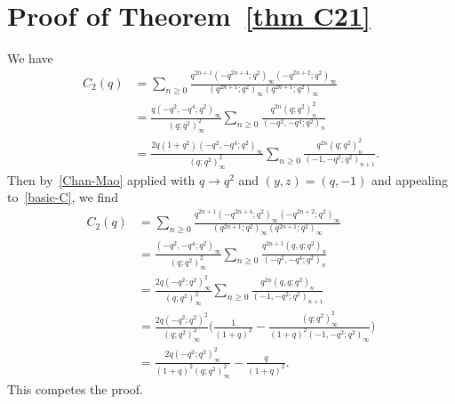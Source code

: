 \documentclass[reqno]{amsart}
\theoremstyle{definition}
\theoremstyle{plain}
\theoremstyle{remark}
\numberwithin{equation}{section}
\newcommand{\fr}{\frac}
\begin{document}
\section{Proof of Theorem~\ref{thm C21}}\label{sec proof C21}
%
We have
\begin{align*}
C_{2}(q)
&= \sum_{n\geq 0}\fr{q^{2n+1} (-q^{2n+4};q^2)_\infty (-q^{2n+2};q^2)_\infty}{(q^{2n+1};q^2)_\infty (q^{2n+1};q^2)_\infty} \\
&=\fr{q (-q^2,-q^4;q^2)_\infty}{(q;q^2)_\infty^2} \sum_{n\geq 0} \fr{q^{2n} (q;q^2)_n^2}{(-q^2,-q^4;q^2)_n} \\
&=\fr{2q(1+q^2)(-q^2,-q^4;q^2)_\infty}{(q;q^2)_\infty^2}\sum_{n\geq 0}\fr{q^{2n} (q;q^2)_n^2}{(-1,-q^2;q^2)_{n+1}}.
\end{align*}
Then by~\eqref{Chan-Mao} applied with $q\to q^2$ and $(y,z)=(q,-1)$ and appealing to~\eqref{basic-C}, we find
\begin{align}
C_{2}(q)
&=\sum_{n\geq 0}\fr{q^{2n+1} (-q^{2n+4};q^2)_\infty (-q^{2n+2};q^2)_\infty}{(q^{2n+1};q^2)_\infty (q^{2n+1};q^2)_\infty} \nonumber \\
&=\fr{(-q^2,-q^4;q^2)_\infty}{(q;q^2)_\infty^2}\sum_{n\geq 0}\fr{q^{2n+1}(q,q;q^2)_n}{(-q^2,-q^4;q^2)_n} \nonumber \\
&=\fr{2q(-q^2;q^2)_\infty^2}{(q;q^2)_\infty^2}\sum_{n\geq 0}\fr{q^{2n}(q,q;q^2)_n}{(-1,-q^2;q^2)_{n+1}} \nonumber \\
&=\fr{2q(-q^2;q^2)^2}{(q;q^2)_\infty^2}
\Big( \fr{1}{(1+q)^2}-\fr{(q;q^2)_\infty^2}{(1+q)^2 (-1,-q^2;q^2)_\infty} \Big) \nonumber\\
&=\fr{2q(-q^2;q^2)_\infty^2}{(1+q)^2 (q;q^2)_\infty^2} - \fr{q}{(1+q)^2} \nonumber.
\end{align}
This competes the proof.
%
\end{document}
